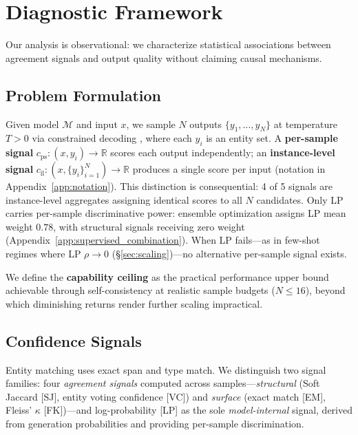 \section{Diagnostic Framework}\label{sec:method}

Our analysis is observational: we characterize statistical associations between agreement signals and output quality without claiming causal mechanisms.

\subsection{Problem Formulation}\label{sec:formulation}

Given model $\mathcal{M}$ and input $x$, we sample $N$ outputs $\{y_1, \ldots, y_N\}$ at temperature $T > 0$ via constrained decoding \cite{willard2023guided}, where each $y_i$ is an entity set.
A \textbf{per-sample signal} $c_{\text{ps}}: (x, y_i) \to \mathbb{R}$ scores each output independently; an \textbf{instance-level signal} $c_{\text{il}}: (x, \{y_i\}_{i=1}^N) \to \mathbb{R}$ produces a single score per input (notation in Appendix~\ref{app:notation}).
This distinction is consequential: 4 of 5 signals are instance-level aggregates assigning identical scores to all $N$ candidates.
Only LP carries per-sample discriminative power: ensemble optimization assigns LP mean weight $0.78$, with structural signals receiving zero weight (Appendix~\ref{app:supervised_combination}).
When LP fails---as in few-shot regimes where LP $\rho{\to}0$ (\S\ref{sec:scaling})---no alternative per-sample signal exists.

We define the \textbf{capability ceiling} as the practical performance upper bound achievable through self-consistency at realistic sample budgets ($N{\leq}16$), beyond which diminishing returns render further scaling impractical.

\subsection{Confidence Signals}\label{sec:signals}

Entity matching uses exact span and type match.
We distinguish two signal families: four \textit{agreement signals} computed across samples---\textit{structural} (Soft Jaccard [SJ], entity voting confidence [VC]) and \textit{surface} (exact match [EM], Fleiss' $\kappa$ [FK])---and log-probability [LP] as the sole \textit{model-internal} signal, derived from generation probabilities and providing per-sample discrimination.

